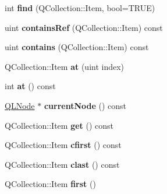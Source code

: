 \begin{DoxyCompactItemize}
\item 
\hypertarget{class_q_g_list_a0f6700e6b7fed2a28364ffcc8e792293}{int {\bfseries find} (Q\-Collection\-::\-Item, bool=T\-R\-U\-E)}\label{class_q_g_list_a0f6700e6b7fed2a28364ffcc8e792293}

\item 
\hypertarget{class_q_g_list_ab384c18c63c84425121df7049a88ef14}{uint {\bfseries contains\-Ref} (Q\-Collection\-::\-Item) const }\label{class_q_g_list_ab384c18c63c84425121df7049a88ef14}

\item 
\hypertarget{class_q_g_list_a70f61c62de5ea79a3b2cc0a7d9ac2366}{uint {\bfseries contains} (Q\-Collection\-::\-Item) const }\label{class_q_g_list_a70f61c62de5ea79a3b2cc0a7d9ac2366}

\item 
\hypertarget{class_q_g_list_a5a0b38a103d1307900b7fa16a7dffcca}{Q\-Collection\-::\-Item {\bfseries at} (uint index)}\label{class_q_g_list_a5a0b38a103d1307900b7fa16a7dffcca}

\item 
\hypertarget{class_q_g_list_a3bce8d0bb4d6fbaa012b9a61c3910907}{int {\bfseries at} () const }\label{class_q_g_list_a3bce8d0bb4d6fbaa012b9a61c3910907}

\item 
\hypertarget{class_q_g_list_a9133971452e43cafe4ff146d785999f7}{\hyperlink{class_q_l_node}{Q\-L\-Node} $\ast$ {\bfseries current\-Node} () const }\label{class_q_g_list_a9133971452e43cafe4ff146d785999f7}

\item 
\hypertarget{class_q_g_list_a8980e2ae172d1c2e71f5471948fd5524}{Q\-Collection\-::\-Item {\bfseries get} () const }\label{class_q_g_list_a8980e2ae172d1c2e71f5471948fd5524}

\item 
\hypertarget{class_q_g_list_a4706f4ab881e855a44c9173c1aa6b9cd}{Q\-Collection\-::\-Item {\bfseries cfirst} () const }\label{class_q_g_list_a4706f4ab881e855a44c9173c1aa6b9cd}

\item 
\hypertarget{class_q_g_list_a6dfdf8c13a2e5da5dc19346a4a6a0317}{Q\-Collection\-::\-Item {\bfseries clast} () const }\label{class_q_g_list_a6dfdf8c13a2e5da5dc19346a4a6a0317}

\item 
\hypertarget{class_q_g_list_aa252117b3e94aede6b1c8c7969843262}{Q\-Collection\-::\-Item {\bfseries first} ()}\label{class_q_g_list_aa252117b3e94aede6b1c8c7969843262}


\end{DoxyCompactItemize}
